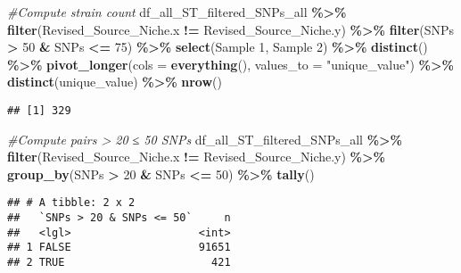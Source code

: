 \documentclass[
]{article}
\newenvironment{Shaded}{\begin{snugshade}}{\end{snugshade}}
\newcommand{\AttributeTok}[1]{\textcolor[rgb]{0.13,0.29,0.53}{#1}}
\newcommand{\CommentTok}[1]{\textcolor[rgb]{0.56,0.35,0.01}{\textit{#1}}}
\newcommand{\DecValTok}[1]{\textcolor[rgb]{0.00,0.00,0.81}{#1}}
\newcommand{\FunctionTok}[1]{\textcolor[rgb]{0.13,0.29,0.53}{\textbf{#1}}}
\newcommand{\NormalTok}[1]{#1}
\newcommand{\SpecialCharTok}[1]{\textcolor[rgb]{0.81,0.36,0.00}{\textbf{#1}}}
\newcommand{\StringTok}[1]{\textcolor[rgb]{0.31,0.60,0.02}{#1}}
\begin{document}
\begin{Shaded}
\begin{Highlighting}[]
\CommentTok{\#Compute strain count}
\NormalTok{df\_all\_ST\_filtered\_SNPs\_all }\SpecialCharTok{\%\textgreater{}\%} \FunctionTok{filter}\NormalTok{(Revised\_Source\_Niche.x }\SpecialCharTok{!=}\NormalTok{ Revised\_Source\_Niche.y) }\SpecialCharTok{\%\textgreater{}\%}
  \FunctionTok{filter}\NormalTok{(SNPs }\SpecialCharTok{\textgreater{}} \DecValTok{50} \SpecialCharTok{\&}\NormalTok{ SNPs }\SpecialCharTok{\textless{}=} \DecValTok{75}\NormalTok{) }\SpecialCharTok{\%\textgreater{}\%}
  \FunctionTok{select}\NormalTok{(}\StringTok{\textasciigrave{}}\AttributeTok{Sample 1}\StringTok{\textasciigrave{}}\NormalTok{, }\StringTok{\textasciigrave{}}\AttributeTok{Sample 2}\StringTok{\textasciigrave{}}\NormalTok{) }\SpecialCharTok{\%\textgreater{}\%}
  \FunctionTok{distinct}\NormalTok{() }\SpecialCharTok{\%\textgreater{}\%}
  \FunctionTok{pivot\_longer}\NormalTok{(}\AttributeTok{cols =} \FunctionTok{everything}\NormalTok{(), }\AttributeTok{values\_to =} \StringTok{"unique\_value"}\NormalTok{) }\SpecialCharTok{\%\textgreater{}\%}
  \FunctionTok{distinct}\NormalTok{(unique\_value) }\SpecialCharTok{\%\textgreater{}\%} \FunctionTok{nrow}\NormalTok{()}
\end{Highlighting}
\end{Shaded}

\begin{verbatim}
## [1] 329
\end{verbatim}

\begin{Shaded}
\begin{Highlighting}[]
\CommentTok{\#Compute pairs \textgreater{} 20 ≤ 50 SNPs}
\NormalTok{df\_all\_ST\_filtered\_SNPs\_all }\SpecialCharTok{\%\textgreater{}\%} \FunctionTok{filter}\NormalTok{(Revised\_Source\_Niche.x }\SpecialCharTok{!=}\NormalTok{ Revised\_Source\_Niche.y) }\SpecialCharTok{\%\textgreater{}\%} \FunctionTok{group\_by}\NormalTok{(SNPs }\SpecialCharTok{\textgreater{}} \DecValTok{20} \SpecialCharTok{\&}\NormalTok{ SNPs }\SpecialCharTok{\textless{}=} \DecValTok{50}\NormalTok{) }\SpecialCharTok{\%\textgreater{}\%} \FunctionTok{tally}\NormalTok{()}
\end{Highlighting}
\end{Shaded}

\begin{verbatim}
## # A tibble: 2 x 2
##   `SNPs > 20 & SNPs <= 50`     n
##   <lgl>                    <int>
## 1 FALSE                    91651
## 2 TRUE                       421
\end{verbatim}
\end{document}
